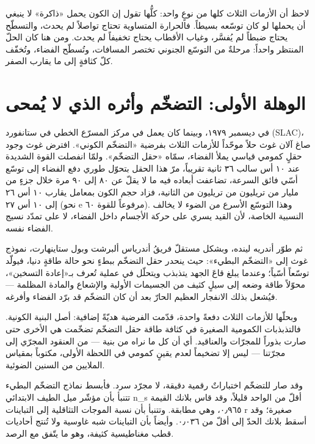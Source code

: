 \documentclass[12pt,a4paper,openany]{book}
\begin{document}
لاحظ أن الأزمات الثلاث كلها من نوعٍ واحد: كلُّها تقول إن الكون يحمل «ذاكرة» لا ينبغي أن يحملها لو كان توسّعه بسيطاً. فالحرارة المتساوية تحتاج تواصلاً لم يحدث، والتسطّح يحتاج ضبطاً لم يُفسَّر، وغياب الأقطاب يحتاج تخفيفاً لم يحدث. ومن هنا كان الحلّ المنتظر واحداً: مرحلةٌ من التوسّع الجنوني تختصر المسافات، وتُسطّح الفضاء، وتُخفّف كلّ كثافةٍ إلى ما يقارب الصفر.


\chapter*{الوهلة الأولى: التضخّم وأثره الذي لا يُمحى}




في ديسمبر ١٩٧٩، وبينما كان يعمل في مركز المسرّع الخطي في ستانفورد (SLAC)، صاغ آلان غوث حلاً موحّداً للأزمات الثلاث بفرضية «التضخّم الكوني». افترض غوث وجود حقلٍ كمومي قياسي يملأ الفضاء، سمّاه «حقل التضخّم». ولمّا انفصلت القوة الشديدة عند ١٠ أس سالب ٣٦ ثانية تقريباً، مرّ هذا الحقل بتحوّل طوري دفع الفضاء إلى توسّع أسّي فائق السرعة، تضاعفت أبعاده فيه ما لا يقلّ عن ٨٠ إلى ٩٠ مرة خلال جزءٍ من مليار من تريليون من تريليون من الثانية، فزاد حجم الكون بمعامل يقارب ١٠ أس ٢٦ إلى ١٠ أس ٢٧ (نحو e مرفوعاً للقوة ٦٠). وهذا التوسّع الأسرع من الضوء لا يخالف النسبية الخاصة، لأن القيد يسري على حركة الأجسام داخل الفضاء، لا على تمدّد نسيج الفضاء نفسه.


ثم طوّر أندريه لينده، وبشكل مستقلّ فريقُ أندرياس ألبرشت وبول ستاينهارت، نموذج غوث إلى «التضخّم البطيء»: حيث ينحدر حقل التضخّم ببطءٍ نحو حالة طاقةٍ دنيا، فيولّد توسّعاً أسّياً؛ وعندما يبلغ قاعَ الجهد يتذبذب ويتحلّل في عملية تُعرف بـ«إعادة التسخين»، محوّلاً طاقة وضعه إلى سيلٍ كثيف من الجسيمات الأولية والإشعاع والمادة المظلمة — فيُشعل بذلك الانفجار العظيم الحارّ بعد أن كان التضخّم قد برّد الفضاء وأفرغه.


وبحلّها للأزمات الثلاث دفعةً واحدة، قدّمت الفرضية هديّةً إضافية: أصل البنية الكونية. فالتذبذبات الكمومية الصغيرة في كثافة طاقة حقل التضخّم تضخّمت هي الأخرى حتى صارت بذوراً للمجرّات والعناقيد. أي أن كل ما نراه من بنية — من العنقود المجرّي إلى مجرّتنا — ليس إلا تضخيماً لعدم يقينٍ كمومي في اللحظة الأولى، مكتوباً بمقياس الملايين من السنين الضوئية.


وقد صار للتضخّم اختباراتٌ رقمية دقيقة، لا مجرّد سرد. فأبسط نماذج التضخّم البطيء تتنبأ بأن مؤشّر ميل الطيف الابتدائي n\_s أقلّ من الواحد قليلاً، وقد قاس بلانك القيمة ٠٫٩٦٥، وهي مطابقة. وتتنبأ بأن نسبة الموجات التثاقلية إلى التباينات r صغيرة؛ وقد أسقط بلانك الحدّ إلى أقلّ من ٠٫٠٣٦. وأيضاً بأن التباينات شبه غاوسية ولا تُنتج أحاديات قطب مغناطيسية كثيفة، وهو ما يتّفق مع الرصد.
\end{document}
